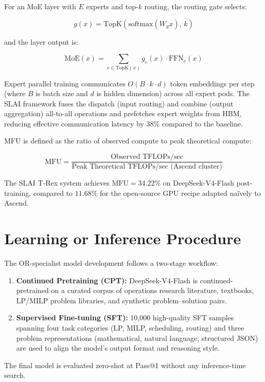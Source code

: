 \documentclass[10pt,twocolumn]{article}
\begin{document}
For an MoE layer with $E$ experts and top-$k$ routing, the routing
gate selects:

\[
g(x) = \mathrm{TopK}\!\left(\mathrm{softmax}(W_g x),\, k\right)
\]

and the layer output is:

\[
\mathrm{MoE}(x) = \sum_{e \in \mathrm{TopK}(x)} g_e(x)\cdot \mathrm{FFN}_e(x)
\]

Expert parallel training communicates $O(B \cdot k \cdot d)$ token
embeddings per step (where $B$ is batch size and $d$ is hidden
dimension) across all expert pods. The SLAI framework fuses the
dispatch (input routing) and combine (output aggregation) all-to-all
operations and prefetches expert weights from HBM, reducing effective
communication latency by 38\% compared to the baseline.

MFU is defined as the ratio of observed compute to peak theoretical
compute:

\[
\mathrm{MFU} = \frac{\text{Observed TFLOPs/sec}}{
  \text{Peak Theoretical TFLOPs/sec (Ascend cluster)}}
\]

The SLAI T-Rex system achieves $\mathrm{MFU} = 34.22\%$ on DeepSeek-V4-Flash
post-training, compared to $11.68\%$ for the open-source GPU recipe
adapted na\"ively to Ascend.

\section{Learning or Inference Procedure}

The OR-specialist model development follows a two-stage workflow:

\begin{enumerate}[itemsep=2pt,parsep=0pt]
  \item \textbf{Continued Pretraining (CPT):} DeepSeek-V4-Flash is
    continued-pretrained on a curated corpus of operations research
    literature, textbooks, LP/MILP problem libraries, and synthetic
    problem--solution pairs.
  \item \textbf{Supervised Fine-tuning (SFT):} 10,000 high-quality
    SFT samples spanning four task categories (LP, MILP, scheduling,
    routing) and three problem representations (mathematical, natural
    language, structured JSON) are used to align the model's output
    format and reasoning style.
\end{enumerate}

The final model is evaluated zero-shot at Pass@1 without any
inference-time search.
\end{document}

